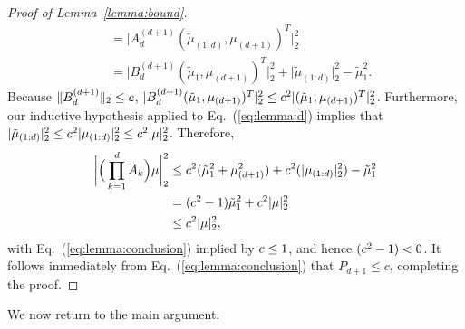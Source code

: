 \begin{proof}[Proof of Lemma~\ref{lemma:bound}]
\begin{align*}
    &= \big\vert A^{(d+1)}_d(\tilde{\mu}_{(1:d)}, \mu_{(d+1)})^T\big\vert^2_2 \\
    &= \big\vert B^{(d+1)}_d (\tilde{\mu}_1, \mu_{(d+1)})^T\big\vert^2_2 + \big\vert\tilde{\mu}_{(1:d)}\big\vert^2_2 - \tilde{\mu}^2_1.
\end{align*}
Because $\|B^{(d+1)}_d\|_2 \leq c$, $\vert B^{(d+1)}_d (\tilde{\mu}_1, \mu_{(d+1)})^T\vert^2_2 \leq c^2\vert(\tilde{\mu}_1, \mu_{(d+1)})^T\vert^2_2$.
Furthermore, our inductive hypothesis applied to Eq.~(\ref{eq:lemma:d}) implies that
$\vert{\tilde{\mu}}_{(1:d)}\vert^2_2 \leq c^2\vert\mu_{(1:d)}\vert^2_2 \leq c^2\vert\mu\vert^2_2$.
Therefore,
\begin{align}
    \bigg\vert\Big(\prod_{k = 1}^d A_k\Big)\mu\bigg\vert^2_2 &\leq c^2({\tilde{\mu}}^2_1 + \mu_{(d+1)}^2) + c^2(\vert\mu_{(1:d)}\vert^2_2) - {\tilde{\mu}}^2_1 \\
    &= (c^2-1){\tilde{\mu}}^2_1 + c^2 \vert\mu\vert^2_2
    \\
    \label{eq:lemma:conclusion}
    &\leq c^2 \vert\mu\vert^2_2,
\end{align}
with Eq.~(\ref{eq:lemma:conclusion}) implied by $c \leq 1$, and hence $(c^2-1) < 0$.
It follows immediately from Eq.~(\ref{eq:lemma:conclusion}) that $P_{d+1}\le c$, completing the proof.
\end{proof}

We now return to the main argument.

